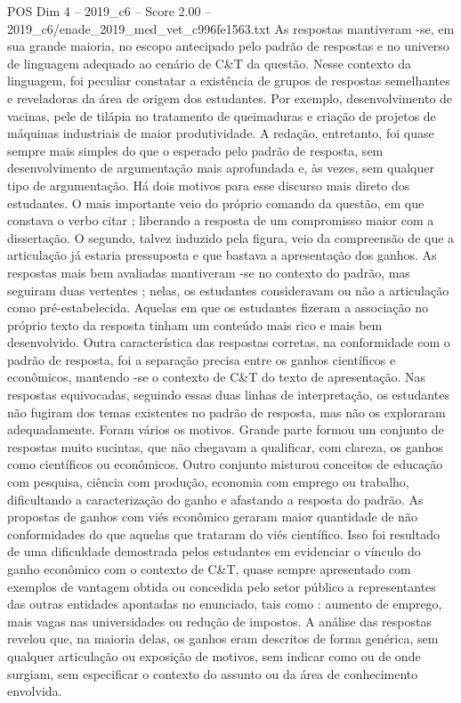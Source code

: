 \begin{textsample}{POS Dim 4 – 2019\_c6 – Score 2.00 – 2019\_c6/enade\_2019\_med\_vet\_c996fe1563.txt}
As respostas mantiveram -se, em sua grande maioria, no escopo antecipado pelo padrão de respostas e no universo de linguagem adequado ao cenário de C\&T da questão.
Nesse contexto da linguagem, foi peculiar constatar a existência de grupos de respostas semelhantes e reveladoras da área de origem dos estudantes.
Por exemplo, desenvolvimento de vacinas, pele de tilápia no tratamento de queimaduras e criação de projetos de máquinas industriais de maior produtividade.
A redação, entretanto, foi quase sempre mais simples do que o esperado pelo padrão de resposta, sem desenvolvimento de argumentação mais aprofundada e, às vezes, sem qualquer tipo de argumentação.
Há dois motivos para esse discurso mais direto dos estudantes.
O mais importante veio do próprio comando da questão, em que constava o verbo citar ; liberando a resposta de um compromisso maior com a dissertação.
O segundo, talvez induzido pela figura, veio da compreensão de que a articulação já estaria pressuposta e que bastava a apresentação dos ganhos.
As respostas mais bem avaliadas mantiveram -se no contexto do padrão, mas seguiram duas vertentes ; nelas, os estudantes consideravam ou não a articulação como pré-estabelecida.
Aquelas em que os estudantes fizeram a associação no próprio texto da resposta tinham um conteúdo mais rico e mais bem desenvolvido.
Outra característica das respostas corretas, na conformidade com o padrão de resposta, foi a separação precisa entre os ganhos científicos e econômicos, mantendo -se o contexto de C\&T do texto de apresentação.
Nas respostas equivocadas, seguindo essas duas linhas de interpretação, os estudantes não fugiram dos temas existentes no padrão de resposta, mas não os exploraram adequadamente.
Foram vários os motivos.
Grande parte formou um conjunto de respostas muito sucintas, que não chegavam a qualificar, com clareza, os ganhos como científicos ou econômicos.
Outro conjunto misturou conceitos de educação com pesquisa, ciência com produção, economia com emprego ou trabalho, dificultando a caracterização do ganho e afastando a resposta do padrão.
As propostas de ganhos com viés econômico geraram maior quantidade de não conformidades do que aquelas que trataram do viés científico.
Isso foi resultado de uma dificuldade demostrada pelos estudantes em evidenciar o vínculo do ganho econômico com o contexto de C\&T, quase sempre apresentado com exemplos de vantagem obtida ou concedida pelo setor público a representantes das outras entidades apontadas no enunciado, tais como : aumento de emprego, mais vagas nas universidades ou redução de impostos.
A análise das respostas revelou que, na maioria delas, os ganhos eram descritos de forma genérica, sem qualquer articulação ou exposição de motivos, sem indicar como ou de onde surgiam, sem especificar o contexto do assunto ou da área de conhecimento envolvida.

\end{textsample}
